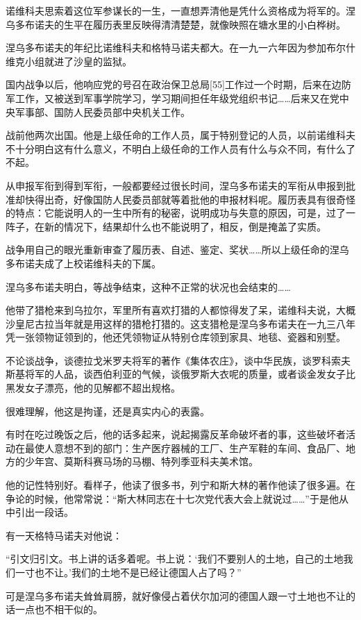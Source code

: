 诺维科夫思索着这位军参谋长的一生，一直想弄清他是凭什么资格成为将军的。涅乌多布诺夫的生平在履历表里反映得清清楚楚，就像映照在塘水里的小白桦树。

涅乌多布诺夫的年纪比诺维科夫和格特马诺夫都大。在一九一六年因为参加布尔什维克小组就进了沙皇的监狱。

国内战争以后，他响应党的号召在政治保卫总局[55]工作过一个时期，后来在边防军工作，又被送到军事学院学习，学习期间担任年级党组织书记……后来又在党中央军事部、国防人民委员部中央机关工作。

战前他两次出国。他是上级任命的工作人员，属于特别登记的人员，以前诺维科夫不十分明白这有什么意义，不明白上级任命的工作人员有什么与众不同，有什么了不起。

从申报军衔到得到军衔，一般都要经过很长时间，涅乌多布诺夫的军衔从申报到批准却快得出奇，好像国防人民委员部就等着批他的申报材料呢。履历表具有很奇怪的特点：它能说明人的一生中所有的秘密，说明成功与失意的原因，可是，过了一阵子，在新的情况下，结果却什么也不能说明了，相反，倒是掩盖了实质。

战争用自己的眼光重新审查了履历表、自述、鉴定、奖状……所以上级任命的涅乌多布诺夫成了上校诺维科夫的下属。

涅乌多布诺夫明白，等战争结束，这种不正常的状况也会结束的……

他带了猎枪来到乌拉尔，军里所有喜欢打猎的人都惊得发了呆，诺维科夫说，大概沙皇尼古拉当年就是用这样的猎枪打猎的。这支猎枪是涅乌多布诺夫在一九三八年凭一张领物证领到的，他还凭领物证从特别仓库领到家具、地毯、瓷器和别墅。

不论谈战争，谈德拉戈米罗夫将军的著作《集体农庄》，谈中华民族，谈罗科索夫斯基将军的人品，谈西伯利亚的气候，谈俄罗斯大衣呢的质量，或者谈金发女子比黑发女子漂亮，他的见解都不超出规格。

很难理解，他这是拘谨，还是真实内心的表露。

有时在吃过晚饭之后，他的话多起来，说起揭露反革命破坏者的事，这些破坏者活动在最使人意想不到的部门：生产医疗器械的工厂、生产军鞋的车间、食品厂、地方的少年宫、莫斯科赛马场的马棚、特列季亚科夫美术馆。

他的记性特别好。看样子，他读了很多书，列宁和斯大林的著作他读了很多遍。在争论的时候，他常常说：“斯大林同志在十七次党代表大会上就说过……”于是他从中引出一段话。

有一天格特马诺夫对他说：

“引文归引文。书上讲的话多着呢。书上说：‘我们不要别人的土地，自己的土地我们一寸也不让。’我们的土地不是已经让德国人占了吗？”

可是涅乌多布诺夫耸耸肩膀，就好像侵占着伏尔加河的德国人跟一寸土地也不让的话一点也不相干似的。

